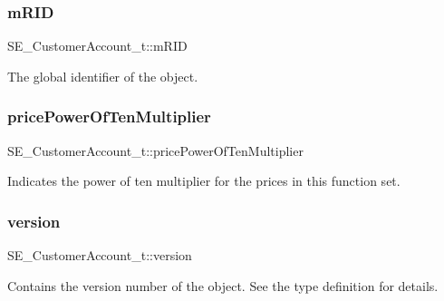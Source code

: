 \subsubsection{\texorpdfstring{m\+R\+ID}{mRID}}
{\footnotesize\ttfamily S\+E\+\_\+\+Customer\+Account\+\_\+t\+::m\+R\+ID}

The global identifier of the object. \mbox{\label{group__CustomerAccount_gae70b8191d202d0a24ee6f90f8cbe9614}} 
\subsubsection{\texorpdfstring{price\+Power\+Of\+Ten\+Multiplier}{pricePowerOfTenMultiplier}}
{\footnotesize\ttfamily S\+E\+\_\+\+Customer\+Account\+\_\+t\+::price\+Power\+Of\+Ten\+Multiplier}

Indicates the power of ten multiplier for the prices in this function set. \mbox{\label{group__CustomerAccount_ga8b1e7a90151362aeb3a332887fa74081}} 
\subsubsection{\texorpdfstring{version}{version}}
{\footnotesize\ttfamily S\+E\+\_\+\+Customer\+Account\+\_\+t\+::version}

Contains the version number of the object. See the type definition for details. 
